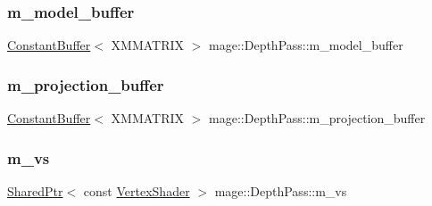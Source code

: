 \hypertarget{classmage_1_1_depth_pass_ad296948a2f4c2b08f18b897ff2d8b03c}{}\label{classmage_1_1_depth_pass_ad296948a2f4c2b08f18b897ff2d8b03c} 
\subsubsection{\texorpdfstring{m\+\_\+model\+\_\+buffer}{m\_model\_buffer}}
{\footnotesize\ttfamily \hyperlink{structmage_1_1_constant_buffer}{Constant\+Buffer}$<$ X\+M\+M\+A\+T\+R\+IX $>$ mage\+::\+Depth\+Pass\+::m\+\_\+model\+\_\+buffer\hspace{0.3cm}{\ttfamily [private]}}

\hypertarget{classmage_1_1_depth_pass_a4c9833ceaf223b73404edab4cf81b7c1}{}\label{classmage_1_1_depth_pass_a4c9833ceaf223b73404edab4cf81b7c1} 
\subsubsection{\texorpdfstring{m\+\_\+projection\+\_\+buffer}{m\_projection\_buffer}}
{\footnotesize\ttfamily \hyperlink{structmage_1_1_constant_buffer}{Constant\+Buffer}$<$ X\+M\+M\+A\+T\+R\+IX $>$ mage\+::\+Depth\+Pass\+::m\+\_\+projection\+\_\+buffer\hspace{0.3cm}{\ttfamily [private]}}

\hypertarget{classmage_1_1_depth_pass_a0db20d0e34ecd2cef5a70a46543be83f}{}\label{classmage_1_1_depth_pass_a0db20d0e34ecd2cef5a70a46543be83f} 
\subsubsection{\texorpdfstring{m\+\_\+vs}{m\_vs}}
{\footnotesize\ttfamily \hyperlink{namespacemage_a1e01ae66713838a7a67d30e44c67703e}{Shared\+Ptr}$<$ const \hyperlink{classmage_1_1_vertex_shader}{Vertex\+Shader} $>$ mage\+::\+Depth\+Pass\+::m\+\_\+vs\hspace{0.3cm}{\ttfamily [private]}}

